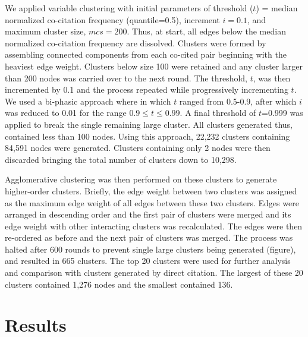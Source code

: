 We applied variable clustering with initial parameters of threshold ($t$) = median normalized co-citation frequency (quantile=0.5), increment $i = 0.1$, and maximum cluster size, $mcs = 200$. Thus, at start, all edges below the median normalized co-citation frequency are dissolved. Clusters were formed by assembling connected components from each co-cited pair beginning with the heaviest edge weight. Clusters below size 100 were retained and any cluster larger than 200 nodes was carried over to the next round. The threshold, $t$, was then incremented by 0.1 and the process repeated while progressively incrementing $t$.  We used a bi-phasic approach where in which $t$ ranged from 0.5-0.9, after which $i$ was reduced to 0.01 for the range $0.9 \leq t \leq 0.99$. A final threshold of $t$=0.999 was applied to break the single remaining large cluster. All clusters generated thus, contained  less than 100 nodes.  Using this approach, 22,232 clusters containing 84,591 nodes were generated. Clusters containing only 2 nodes were then discarded bringing the total number of clusters down to 10,298. 

Agglomerative clustering was then performed on these clusters to generate higher-order clusters. Briefly, the edge weight between two clusters was assigned as the maximum edge weight of all edges between these two clusters. Edges were arranged in descending order and the first pair of clusters were merged and its edge weight with other interacting clusters was recalculated. The edges were then re-ordered as before and the next pair of clusters was merged. The process was halted after 600 rounds to prevent single large clusters being generated (figure), and resulted in 665 clusters. The top 20 clusters were used for further analysis and comparison with clusters generated by direct citation. The largest of these 20 clusters contained 1,276 nodes and the smallest contained 136.

\section{Results}
\label{sec:results}

